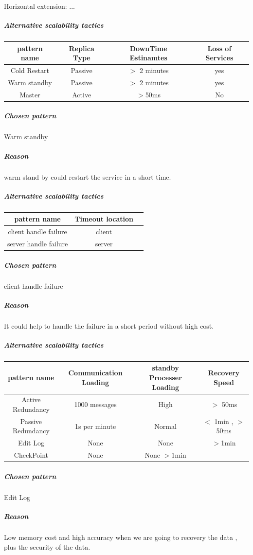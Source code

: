 \documentclass{article}
\begin{document}
				Horizontal extension:
					...
			\subparagraph{Alternative scalability tactics}
					\begin{center}
						\begin{tabular}{|c|c|c|c|}
							\hline
							pattern name & Replica Type & DownTime Estinamtes & Loss of Services\\
							\hline
							Cold Restart & Passive 		& $>$ 2 minutes			  & yes			\\
							\hline
							Warm standby & Passive     &  $>$ 2 minutes			  & yes			\\
							\hline
							Master		 & Active		& $>$50ms & No\\
							\hline
						\end{tabular}
					\end{center}
					\subparagraph{Chosen pattern} 
					Warm standby
					\subparagraph{Reason} 
					warm stand by could restart the service in a short time.
			\subparagraph{Alternative scalability tactics}
					\begin{center}
						\begin{tabular}{|c|c|c|}
							\hline
							pattern name & Timeout location\\
							\hline
							client handle failure & client \\
							\hline
							server handle failure & server\\ 
							\hline
						\end{tabular}
					\end{center}
					\subparagraph{Chosen pattern} 
					client handle failure 
					\subparagraph{Reason} 
					It could help to handle the failure in a short period without high cost.
			\subparagraph{Alternative scalability tactics}
					\begin{center}
						\begin{tabular}{|c|c|c|c|}
							\hline
							pattern name & Communication Loading & standby Processer Loading & Recovery Speed\\
							\hline
							Active Redundancy & 1000 messages & High & $>$ 50ms \\
							\hline
							Passive Redundancy & 1s per minute & Normal & $<$ 1min , $>$ 50ms \\
							\hline
							Edit Log 	& None & None & $>$1min\\
							\hline
							CheckPoint & None & None $> $1min\\
							\hline
						\end{tabular}
					\end{center}
					\subparagraph{Chosen pattern} 
					Edit Log
					\subparagraph{Reason} 
					Low memory cost and high accuracy when we are going to recovery the data , plus the security of the data.
					
\end{document}
